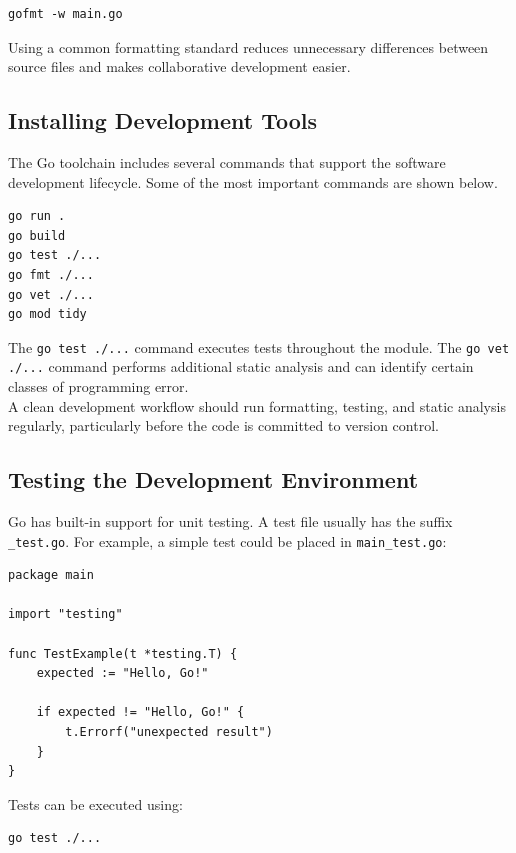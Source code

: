 \begin{lstlisting}
gofmt -w main.go
\end{lstlisting}

Using a common formatting standard reduces unnecessary differences between source files and makes collaborative development easier.

\subsection{Installing Development Tools}

The Go toolchain includes several commands that support the software development lifecycle. Some of the most important commands are shown below.

\begin{lstlisting}
go run .
go build
go test ./...
go fmt ./...
go vet ./...
go mod tidy
\end{lstlisting}

The \texttt{go test ./...} command executes tests throughout the module. The \texttt{go vet ./...} command performs additional static analysis and can identify certain classes of programming error.\\

A clean development workflow should run formatting, testing, and static analysis regularly, particularly before the code is committed to version control.

\subsection{Testing the Development Environment}

Go has built-in support for unit testing. A test file usually has the suffix \texttt{\_test.go}. For example, a simple test could be placed in \texttt{main_test.go}:

\begin{lstlisting}
package main

import "testing"

func TestExample(t *testing.T) {
    expected := "Hello, Go!"

    if expected != "Hello, Go!" {
        t.Errorf("unexpected result")
    }
}
\end{lstlisting}

Tests can be executed using:

\begin{lstlisting}
go test ./...
\end{lstlisting}

